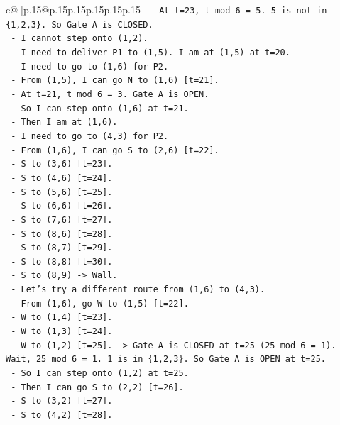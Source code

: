 \documentclass{article}
\begin{document}
{\begin{supertabular}{c@{$\;$}|p{.15\linewidth}@{}p{.15\linewidth}p{.15\linewidth}p{.15\linewidth}p{.15\linewidth}p{.15\linewidth}}
{{{\texttt{   {-} At t=23, t mod 6 = 5. 5 is not in \{1,2,3\}. So Gate A is CLOSED.} \\
\texttt{   {-} I cannot step onto (1,2).} \\
\texttt{   {-} I need to deliver P1 to (1,5). I am at (1,5) at t=20.} \\
\texttt{   {-} I need to go to (1,6) for P2.} \\
\texttt{   {-} From (1,5), I can go N to (1,6) {[}t=21{]}.} \\
\texttt{   {-} At t=21, t mod 6 = 3. Gate A is OPEN.} \\
\texttt{   {-} So I can step onto (1,6) at t=21.} \\
\texttt{   {-} Then I am at (1,6).} \\
\texttt{   {-} I need to go to (4,3) for P2.} \\
\texttt{   {-} From (1,6), I can go S to (2,6) {[}t=22{]}.} \\
\texttt{   {-} S to (3,6) {[}t=23{]}.} \\
\texttt{   {-} S to (4,6) {[}t=24{]}.} \\
\texttt{   {-} S to (5,6) {[}t=25{]}.} \\
\texttt{   {-} S to (6,6) {[}t=26{]}.} \\
\texttt{   {-} S to (7,6) {[}t=27{]}.} \\
\texttt{   {-} S to (8,6) {[}t=28{]}.} \\
\texttt{   {-} S to (8,7) {[}t=29{]}.} \\
\texttt{   {-} S to (8,8) {[}t=30{]}.} \\
\texttt{   {-} S to (8,9) {-}> Wall.} \\
\texttt{   {-} Let's try a different route from (1,6) to (4,3).} \\
\texttt{   {-} From (1,6), go W to (1,5) {[}t=22{]}.} \\
\texttt{   {-} W to (1,4) {[}t=23{]}.} \\
\texttt{   {-} W to (1,3) {[}t=24{]}.} \\
\texttt{   {-} W to (1,2) {[}t=25{]}. {-}> Gate A is CLOSED at t=25 (25 mod 6 = 1). Wait, 25 mod 6 = 1. 1 is in \{1,2,3\}. So Gate A is OPEN at t=25.} \\
\texttt{   {-} So I can step onto (1,2) at t=25.} \\
\texttt{   {-} Then I can go S to (2,2) {[}t=26{]}.} \\
\texttt{   {-} S to (3,2) {[}t=27{]}.} \\
\texttt{   {-} S to (4,2) {[}t=28{]}.} \\
}}}
\end{supertabular}}
\end{document}
